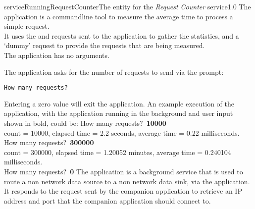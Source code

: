%
{serviceRunningRequestCounter}{The \emph{\MMMU} entity for the \emph{Request Counter}
service}{1.0}
\condPage
{}
The  application is a command\longDash{}line tool to
measure the average time to process a simple request.\\

It uses the  and
 requests sent to the
 application to gather the statistics, and a
`dummy' request to provide the requests that are being measured.\\

The application has no arguments.
\insertShortClientParameters{}

The application asks for the number of requests to send via the prompt:
\outputBegin
\begin{verbatim}
How many requests?
\end{verbatim}
\outputEnd{}
Entering a zero value will exit the application.
An example execution of the application, with the 
application running in the background and user input shown in bold, could be:
\outputBegin{}
How many requests?\ \textbf{10000}\\
count = 10000, elapsed time = 2.2 seconds, average time = 0.22 milliseconds.\\
How many requests?\ \textbf{300000}\\
count = 300000, elapsed time = 1.20052 minutes, average time = 0.240104 milliseconds.\\
How many requests?\ \textbf{0}
\outputEnd
{}
\condPage
{}
The  application is a background service that is used to
route a non\longDash\yarp{} network data source to a non\longDash\yarp{} network data
sink, via the  application.\\

It responds to the  request sent by the
companion application  to retrieve an IP address and port
that the companion application should connect to.\\

